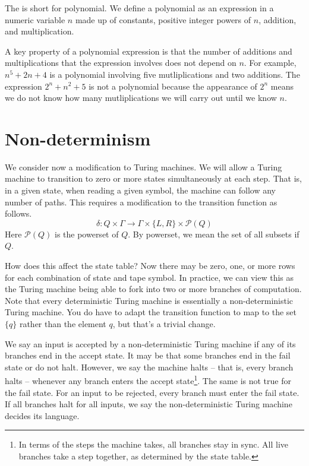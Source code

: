 \documentclass{iansnotes}
\begin{document}
  The  is short for polynomial.
  We define a polynomial as an expression in a numeric variable $n$ made up of constants, positive integer powers of $n$, addition, and multiplication.
 
  A key property of a polynomial expression is that the number of additions and multiplications that the expression involves does not depend on $n$.
  For example, $n^5 + 2n + 4$ is a polynomial involving five mutliplications and two additions.
  The expression $2^n + n^2 + 5$ is not a polynomial because the appearance of $2^n$ means we do not know how many mutliplications we will carry out until we know $n$.


\section{Non-determinism}
  \label{sect:nondet}
  We consider now a modification to Turing machines.
  We will allow a Turing machine to transition to zero or more states simultaneously at each step.
  That is, in a given state, when reading a given symbol, the machine can follow any number of paths.
  This requires a modification to the transition function as follows.
   \[ \delta: Q \times \Gamma \rightarrow \Gamma \times \{ L, R \} \times \mathcal{P}(Q) \]
  Here $\mathcal{P}(Q)$ is the powerset of $Q$.
  By powerset, we mean the set of all subsets if $Q$.

  How does this affect the state table?
  Now there may be zero, one, or more rows for each combination of state and tape symbol.
  In practice, we can view this as the Turing machine being able to fork into two or more branches of computation.
  Note that every deterministic Turing machine is essentially a non-deterministic Turing machine.
  You do have to adapt the transition function to map to the set $\{ q \}$ rather than the element $q$, but that's a trivial change.

  We say an input is accepted by a non-deterministic Turing machine if any of its branches end in the accept state.
  It may be that some branches end in the fail state or do not halt.
  However, we say the machine halts -- that is, every branch halts -- whenever any branch enters the accept state\footnote{In terms of the steps the machine takes, all branches stay in sync. All live branches take a step together, as determined by the state table.}.
  The same is not true for the fail state.
  For an input to be rejected, every branch must enter the fail state.
  If all branches halt for all inputs, we say the non-deterministic Turing machine decides its language.
\end{document}
